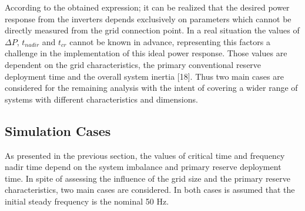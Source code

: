 
According to the obtained expression; it can be realized that the desired power response from the inverters depends exclusively on parameters which cannot be directly measured from the grid connection point. In a real situation the values of $\Delta P$, $ t_{nadir} $ and $ t_{cr} $ cannot be known in advance, representing this factors a challenge in the implementation of this ideal power response. Those values are dependent on the grid characteristics, the primary conventional reserve deployment time and the overall system inertia [18]. Thus two main cases are considered for the remaining analysis with the intent of covering a wider range of systems with different characteristics and dimensions.

\subsection{Simulation Cases}

As presented in the previous section, the values of critical time and frequency nadir time depend on the system imbalance and primary reserve deployment time.  In spite of assessing the influence of the grid size and the primary reserve characteristics, two main cases are considered. In both cases is assumed that the initial steady frequency is the nominal 50 Hz.


